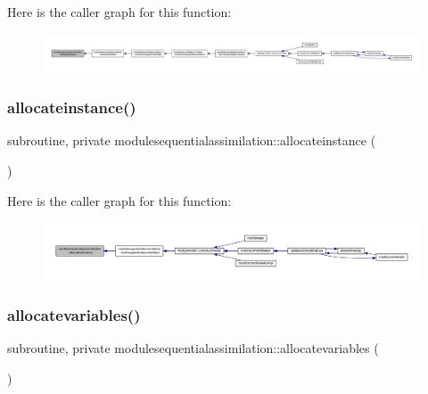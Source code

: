 Here is the caller graph for this function\+:\nopagebreak
\begin{figure}[H]
\begin{center}
\leavevmode
\includegraphics[width=350pt]{namespacemodulesequentialassimilation_a891242d04c33e25fc2d6c1b0bbbcdb59_icgraph}
\end{center}
\end{figure}
\mbox{\label{namespacemodulesequentialassimilation_aa0f41510375f375c75e2f8a43000247e}} 
\subsubsection{\texorpdfstring{allocateinstance()}{allocateinstance()}}
{\footnotesize\ttfamily subroutine, private modulesequentialassimilation\+::allocateinstance (\begin{DoxyParamCaption}{ }\end{DoxyParamCaption})\hspace{0.3cm}{\ttfamily [private]}}

Here is the caller graph for this function\+:\nopagebreak
\begin{figure}[H]
\begin{center}
\leavevmode
\includegraphics[width=350pt]{namespacemodulesequentialassimilation_aa0f41510375f375c75e2f8a43000247e_icgraph}
\end{center}
\end{figure}
\mbox{\label{namespacemodulesequentialassimilation_af08be0960351f7f29fe3b0b796b72da3}} 
\subsubsection{\texorpdfstring{allocatevariables()}{allocatevariables()}}
{\footnotesize\ttfamily subroutine, private modulesequentialassimilation\+::allocatevariables (\begin{DoxyParamCaption}{ }\end{DoxyParamCaption})\hspace{0.3cm}{\ttfamily [private]}}

